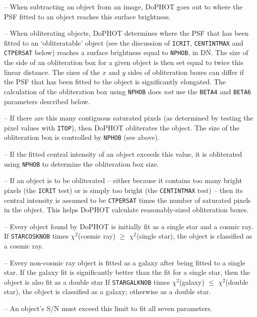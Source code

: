  -- When subtracting an object from an
image, DoPHOT goes out to where the 
PSF fitted to an object reaches this surface brightness.

 -- When obliterating objects,
DoPHOT determines where the PSF that has been fitted
to an `obliteratable' object (see the discussion of {\tt ICRIT}, 
{\tt CENTINTMAX} and {\tt CTPERSAT} below) reaches a 
surface brightness equal to {\tt NPHOB}, in DN.  
The size of the side of an obliteration box for a given object is then set 
equal to
twice this linear distance.  The sizes of the $x$ and $y$ sides of 
obliteration boxes can differ if the PSF that has been fitted to the 
object is significantly elongated.  The calculation of the
obliteration box using {\tt NPHOB} does {\it not}
use the {\tt BETA4} and {\tt BETA6} parameters
described below.

 -- If there are this many contiguous
saturated pixels (as determined by testing the pixel
values with {\tt ITOP}), then DoPHOT obliterates the object.
The size of the obliteration box is controlled by {\tt NPHOB}
(see above).  

 -- If the fitted central intensity of
an object exceeds this value, it is obliterated using {\tt NPHOB}
to determine the obliteration box size.  

 -- If an object is to be obliterated
-- either because it contains too many bright pixels (the
{\tt ICRIT} test) or is simply too bright (the {\tt CENTINTMAX}
test) -- then its central intensity is assumed to be 
{\tt CTPERSAT} times the number of saturated pixels in the
object.  This helps DoPHOT calculate reasonably-sized
obliteration boxes.  

 -- Every object found by DoPHOT
is initially fit as a single star and a cosmic ray.
If {\tt STARCOSKNOB} times $\chi^2$(cosmic ray) $\geq$ 
$\chi^2$(single star), the object is classified as a
cosmic ray.  

 -- Every non-cosmic ray
object is fitted as a galaxy after being fitted to a single star.
If the galaxy fit is significantly better than the fit for a
single star, then the object is also fit as a double star 
If {\tt STARGALKNOB} times $\chi^2$(galaxy) $\leq$ 
$\chi^2$(double star), the object is classified as a 
galaxy; otherwise as a double star.  

 -- An object's S/N must exceed this limit
to fit all seven parameters.  

